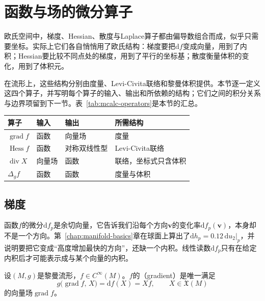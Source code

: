 \section{函数与场的微分算子}
\label{sec:mcalc-operators}

欧氏空间中，梯度、Hessian、散度与Laplace算子都由偏导数组合而成，似乎只需要坐标。实际上它们各自悄悄用了欧氏结构：梯度要把$\mathrm df$变成向量，用到了内积；Hessian要比较不同点处的梯度，用到了平行的坐标基；散度衡量体积的变化，用到了体积元。

在流形上，这些结构分别由度量、Levi-Civita联络和黎曼体积提供。本节逐一定义这四个算子，并写明每个算子的输入、输出和所依赖的结构；它们之间的积分关系与边界项留到下一节。表~\ref{tab:mcalc-operators}是本节的汇总。

\begin{BookInlineTable}
  \centering
  \begin{tabular}{llll}
    \toprule
    算子 & 输入 & 输出 & 所需结构\\
    \midrule
    $\operatorname{grad}f$ & 函数 & 向量场 & 度量\\
    $\operatorname{Hess}f$ & 函数 & 对称双线性型 & Levi-Civita联络\\
    $\operatorname{div}X$ & 向量场 & 函数 & 联络，坐标式只含体积\\
    $\Delta_gf$ & 函数 & 函数 & 度量与体积\\
    \bottomrule
  \end{tabular}
  \caption{四个算子的输入、输出和所需结构。外微分不在此列，它只需要光滑结构。}
  \label{tab:mcalc-operators}
\end{BookInlineTable}

\subsection{梯度}
\label{sec:mcalc-gradient}

函数$f$的微分$\mathrm df_p$是余切向量，它告诉我们沿每个方向$\bm v$的变化率$\mathrm df_p(\bm v)$，本身却不是一个方向。第~\ref{chap:manifold-basics}章在球面上算出了$\mathrm dh_p=0.12\,\mathrm du_2|_p$，并说明要把它变成“高度增加最快的方向”，还缺一个内积。线性读数$\mathrm df_p$只有在给定内积后才可能表示成与某个向量的内积。

\begin{definition}[梯度]
\label{def:mcalc-gradient}
设$(M,g)$是黎曼流形，$f\in C^\infty(M)$。$f$的（gradient）是唯一满足
\begin{equation}
g\bigl(\operatorname{grad}f,\,X\bigr)=\mathrm df(X)=Xf,\qquad X\in\mathfrak X(M)
\label{eq:mcalc-gradient}
\end{equation}
的向量场$\operatorname{grad}f$。
\end{definition}

